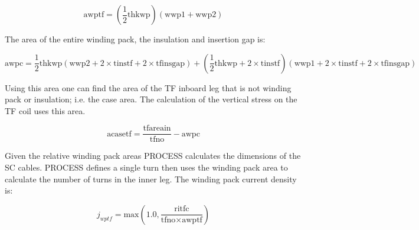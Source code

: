 \documentclass[hidelinks]{article}
\numberwithin{equation}{section}
\begin{document}
    \begin{equation}\label{eq: awptf}
    \text{awptf} = (\frac{1}{2}\text{thkwp})(\text{wwp1}+\text{wwp2}) 
    \end{equation}

    \noi The area of the entire winding pack, the insulation and insertion gap is:

    \begin{equation}\label{eq: awpc}
    \text{awpc} = \frac{1}{2}\text{thkwp}(\text{wwp2} + 2\times \text{tinstf} 
    + 2\times \text{tfinsgap}) + (\frac{1}{2}\text{thkwp} + 2\times \text{tinstf})(\text{wwp1} 
    + 2 \times \text{tinstf} + 2\times \text{tfinsgap})
    \end{equation}

    \noi Using this area one can find the area of the TF inboard leg that 
    is not winding pack or insulation; i.e. the case area. The calculation of the 
    vertical stress on the TF coil uses this area.

    \begin{equation}\label{eq: acasetf}
    \text{acasetf} = \frac{\text{tfareain}}{\text{tfno}} - \text{awpc}
    \end{equation}

    \noi Given the relative winding pack areas PROCESS calculates the dimensions of 
    the SC cables. PROCESS defines a single turn then uses the winding pack area to 
    calculate the number of turns in the inner leg. The winding pack current density is:

    \begin{equation}
    j_{wptf} = \text{max}(1.0, \frac{\text{ritfc}}{\text{tfno} \times \text{awptf}})
    \end{equation}
\end{document}
